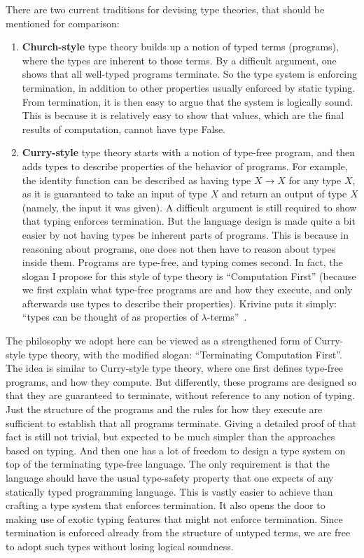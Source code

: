\documentclass{article}
\begin{document}
There are two current traditions for devising type theories, that
should be mentioned for comparison:

\begin{enumerate}
\item \textbf{Church-style} type theory builds up a notion of typed
  terms (programs), where the types are inherent to those terms.  By a
  difficult argument, one shows that all well-typed programs
  terminate.  So the type system is enforcing termination, in addition
  to other properties usually enforced by static typing.  From
  termination, it is then easy to argue that the system is logically
  sound.  This is because it is relatively easy to show that values,
  which are the final results of computation, cannot have type False.

\item \textbf{Curry-style} type theory starts with a notion of
  type-free program, and then adds types to describe properties of the
  behavior of programs.  For example, the identity function can be
  described as having type $X \to X$ for any type $X$, as it is
  guaranteed to take an input of type $X$ and return an output of type
  $X$ (namely, the input it was given).  A difficult argument is still
  required to show that typing enforces termination.  But the language
  design is made quite a bit easier by not having types be inherent
  parts of programs.  This is because in reasoning about programs,
  one does not then have to reason about types inside them.  Programs
  are type-free, and typing comes second.  In fact, the slogan I propose
  for this style of type theory is ``Computation First'' (because we
  first explain what type-free programs are and how they execute, and
  only afterwards use types to describe their properties).  Krivine puts it simply: ``types can
  be thought of as properties of $\lambda$-terms''~\cite[page 43]{krivine93}.
\end{enumerate}

The philosophy we adopt here can be viewed as a strengthened form of
Curry-style type theory, with the modified slogan: ``Terminating
Computation First''.  The idea is similar to Curry-style type theory,
where one first defines type-free programs, and how they compute.  But
differently, these programs are designed so that they are guaranteed
to terminate, without reference to any notion of typing.  Just the
structure of the programs and the rules for how they execute are
sufficient to establish that all programs terminate.  Giving a
detailed proof of that fact is still not trivial, but expected to be
much simpler than the approaches based on typing.  And then one has a
lot of freedom to design a type system on top of the terminating
type-free language.  The only requirement is that the language should
have the usual type-safety property that one expects of any
statically typed programming language. This is vastly easier to
achieve than crafting a type system that enforces termination.  It
also opens the door to making use of exotic typing features that might
not enforce termination.  Since termination is enforced already from
the structure of untyped terms, we are free to adopt such types
without losing logical soundness.
\end{document}
